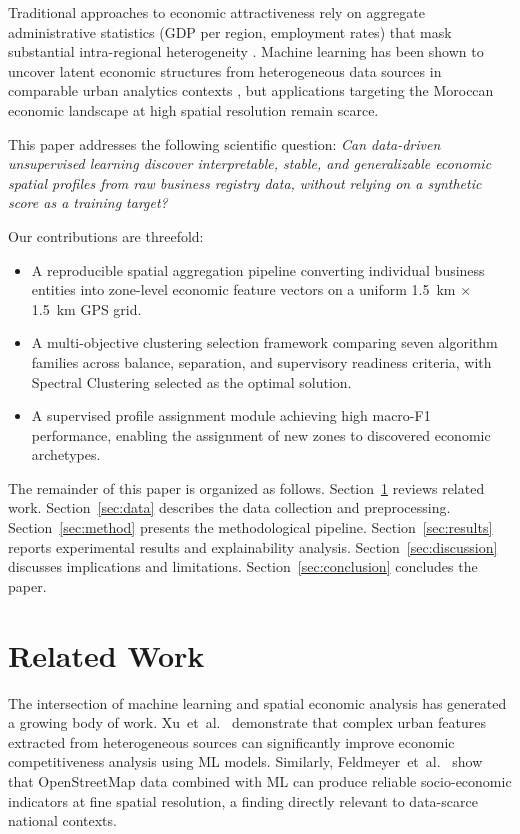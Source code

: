 \documentclass[conference]{IEEEtran}
\begin{document}
Traditional approaches to economic attractiveness rely on
aggregate administrative statistics (GDP per region, employment rates)
that mask substantial intra-regional heterogeneity
\cite{xu2023enhancing,feldmeyer2020using}.
Machine learning has been shown to uncover latent economic structures
from heterogeneous data sources in comparable urban analytics contexts
\cite{chen2025machine,huang2022machine,kourtit2021safe},
but applications targeting the Moroccan economic landscape
at high spatial resolution remain scarce.

This paper addresses the following scientific question:
\textit{Can data-driven unsupervised learning discover interpretable,
stable, and generalizable economic spatial profiles from raw business
registry data, without relying on a synthetic score as a training target?}

Our contributions are threefold:
\begin{itemize}
  \item A reproducible spatial aggregation pipeline converting
    individual business entities into zone-level economic feature vectors
    on a uniform 1.5~km $\times$ 1.5~km GPS grid.
  \item A multi-objective clustering selection framework comparing seven
    algorithm families across balance, separation, and supervisory readiness
    criteria, with Spectral Clustering selected as the optimal solution.
  \item A supervised profile assignment module achieving high macro-F1
    performance, enabling the assignment of new zones to discovered
    economic archetypes.
\end{itemize}

The remainder of this paper is organized as follows.
Section~\ref{sec:related} reviews related work.
Section~\ref{sec:data} describes the data collection and preprocessing.
Section~\ref{sec:method} presents the methodological pipeline.
Section~\ref{sec:results} reports experimental results and explainability analysis.
Section~\ref{sec:discussion} discusses implications and limitations.
Section~\ref{sec:conclusion} concludes the paper.

\section{Related Work}
\label{sec:related}

The intersection of machine learning and spatial economic analysis
has generated a growing body of work. Xu~et~al.~\cite{xu2023enhancing}
demonstrate that complex urban features extracted from heterogeneous
sources can significantly improve economic competitiveness analysis
using ML models. Similarly, Feldmeyer~et~al.~\cite{feldmeyer2020using}
show that OpenStreetMap data combined with ML can produce reliable
socio-economic indicators at fine spatial resolution, a finding
directly relevant to data-scarce national contexts.
\end{document}
